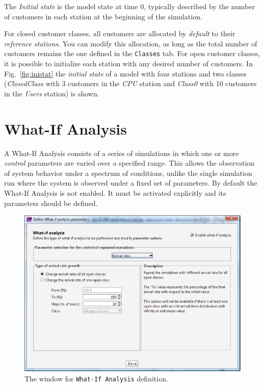 {\large{}}

The \emph{Initial state} is the model state at time 0, typically
described by the number of customers in each station at the
beginning of the simulation.

For closed customer classes, all customers are allocated by
\emph{default} to their \emph{reference stations}. You can modify
this allocation, as long as the total number of customers remains
the one defined in the \texttt{Classes} tab. For open customer
classes, it is possible to initialize each station with any
desired number of customers. In Fig.~\ref{fig:inistat} the
\emph{initial state} of a model with four stations and two classes
(\emph{ClosedClass} with 3 customers in the \emph{CPU} station and
\emph{Class0} with 10 customers in the \emph{Users} station) is
shown.


\section{What-If Analysis}
\label{whaif}

A What-If Analysis consists of a series of simulations in which
one or more \emph{control} parameters are varied over a specified
range. This allows the observation of system behavior under a
spectrum of conditions, unlike the single simulation run where the
system is observed under a fixed set of parameters. By default the
What-If Analysis is not enabled. It must be activated explicitly
and its parameters should be defined.
\begin{figure}[hbt]
    \begin{center}
        \includegraphics[scale=.5]{img/jsimg/7.1.eps}
    \end{center}
    \caption{The window for \texttt{What-If Analysis} definition.}
    \label{fig:iniwhatif}
\end{figure}

